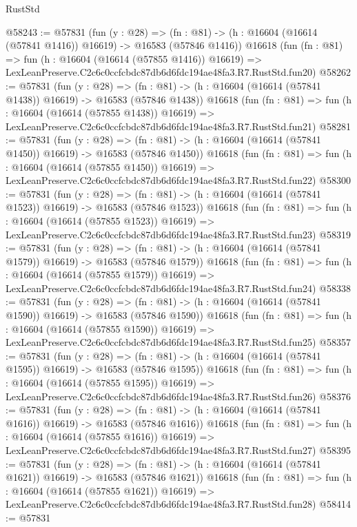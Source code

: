 \begin{lexlean}{RustStd}
\begin{coremodule}
@58243 := @57831
    (fun (y : @28) =>
    (fn : @81) -> (h : @16604 (@16614 (@57841 @1416)) @16619) -> @16583 (@57846 @1416))
    @16618
    (fun (fn : @81) =>
    fun (h : @16604 (@16614 (@57855 @1416)) @16619) =>
    LexLeanPreserve.C2c6c0ccfcbdc87db6d6fdc194ae48fa3.R7.RustStd.fun20)
@58262 := @57831
    (fun (y : @28) =>
    (fn : @81) -> (h : @16604 (@16614 (@57841 @1438)) @16619) -> @16583 (@57846 @1438))
    @16618
    (fun (fn : @81) =>
    fun (h : @16604 (@16614 (@57855 @1438)) @16619) =>
    LexLeanPreserve.C2c6c0ccfcbdc87db6d6fdc194ae48fa3.R7.RustStd.fun21)
@58281 := @57831
    (fun (y : @28) =>
    (fn : @81) -> (h : @16604 (@16614 (@57841 @1450)) @16619) -> @16583 (@57846 @1450))
    @16618
    (fun (fn : @81) =>
    fun (h : @16604 (@16614 (@57855 @1450)) @16619) =>
    LexLeanPreserve.C2c6c0ccfcbdc87db6d6fdc194ae48fa3.R7.RustStd.fun22)
@58300 := @57831
    (fun (y : @28) =>
    (fn : @81) -> (h : @16604 (@16614 (@57841 @1523)) @16619) -> @16583 (@57846 @1523))
    @16618
    (fun (fn : @81) =>
    fun (h : @16604 (@16614 (@57855 @1523)) @16619) =>
    LexLeanPreserve.C2c6c0ccfcbdc87db6d6fdc194ae48fa3.R7.RustStd.fun23)
@58319 := @57831
    (fun (y : @28) =>
    (fn : @81) -> (h : @16604 (@16614 (@57841 @1579)) @16619) -> @16583 (@57846 @1579))
    @16618
    (fun (fn : @81) =>
    fun (h : @16604 (@16614 (@57855 @1579)) @16619) =>
    LexLeanPreserve.C2c6c0ccfcbdc87db6d6fdc194ae48fa3.R7.RustStd.fun24)
@58338 := @57831
    (fun (y : @28) =>
    (fn : @81) -> (h : @16604 (@16614 (@57841 @1590)) @16619) -> @16583 (@57846 @1590))
    @16618
    (fun (fn : @81) =>
    fun (h : @16604 (@16614 (@57855 @1590)) @16619) =>
    LexLeanPreserve.C2c6c0ccfcbdc87db6d6fdc194ae48fa3.R7.RustStd.fun25)
@58357 := @57831
    (fun (y : @28) =>
    (fn : @81) -> (h : @16604 (@16614 (@57841 @1595)) @16619) -> @16583 (@57846 @1595))
    @16618
    (fun (fn : @81) =>
    fun (h : @16604 (@16614 (@57855 @1595)) @16619) =>
    LexLeanPreserve.C2c6c0ccfcbdc87db6d6fdc194ae48fa3.R7.RustStd.fun26)
@58376 := @57831
    (fun (y : @28) =>
    (fn : @81) -> (h : @16604 (@16614 (@57841 @1616)) @16619) -> @16583 (@57846 @1616))
    @16618
    (fun (fn : @81) =>
    fun (h : @16604 (@16614 (@57855 @1616)) @16619) =>
    LexLeanPreserve.C2c6c0ccfcbdc87db6d6fdc194ae48fa3.R7.RustStd.fun27)
@58395 := @57831
    (fun (y : @28) =>
    (fn : @81) -> (h : @16604 (@16614 (@57841 @1621)) @16619) -> @16583 (@57846 @1621))
    @16618
    (fun (fn : @81) =>
    fun (h : @16604 (@16614 (@57855 @1621)) @16619) =>
    LexLeanPreserve.C2c6c0ccfcbdc87db6d6fdc194ae48fa3.R7.RustStd.fun28)
@58414 := @57831

\end{coremodule}
\end{lexlean}
